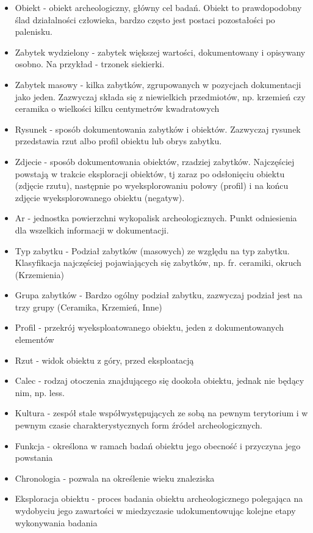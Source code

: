 \begin{itemize}
\item Obiekt - obiekt archeologiczny, główny cel badań. Obiekt to prawdopodobny ślad działalności człowieka, bardzo często jest postaci pozostałości po palenisku.
\item Zabytek wydzielony - zabytek większej wartości, dokumentowany i opisywany osobno. Na przykład - trzonek siekierki.
\item Zabytek masowy - kilka zabytków, zgrupowanych w pozycjach dokumentacji jako jeden. Zazwyczaj składa się z niewielkich przedmiotów, np. krzemień czy ceramika o wielkości kilku centymetrów kwadratowych
\item Rysunek - sposób dokumentowania zabytków i obiektów. Zazwyczaj rysunek przedstawia rzut albo profil obiektu lub obrys zabytku.
\item Zdjecie - sposób dokumentowania obiektów, rzadziej zabytków. Najczęściej powstają w trakcie eksploracji obiektów, tj zaraz po odsłonięciu obiektu (zdjęcie rzutu), następnie po wyeksplorowaniu połowy (profil) i na końcu zdjęcie wyeksplorowanego obiektu (negatyw).
\item Ar - jednostka powierzchni wykopalisk archeologicznych. Punkt odniesienia dla wszelkich informacji w dokumentacji.
\item Typ zabytku - Podział zabytków (masowych) ze względu na typ zabytku. Klasyfikacja najczęściej pojawiających się zabytków, np. fr. ceramiki, okruch (Krzemienia)
\item Grupa zabytków - Bardzo ogólny podział zabytku, zazwyczaj podział jest na trzy grupy (Ceramika, Krzemień, Inne)
\item Profil - przekrój wyeksploatowanego obiektu, jeden z dokumentowanych elementów
\item Rzut - widok obiektu z góry, przed eksploatacją
\item Calec - rodzaj otoczenia znajdującego się dookoła obiektu, jednak nie będący nim, np. less.
\item Kultura - zespół stale współwystępujących ze sobą na pewnym terytorium i w pewnym czasie charakterystycznych form źródeł archeologicznych.
\item Funkcja - określona w ramach badań obiektu jego obecność i przyczyna jego powstania
\item Chronologia - pozwala na określenie wieku znaleziska
\item Eksploracja obiektu - proces badania obiektu archeologicznego polegająca na wydobyciu jego zawartości w miedzyczasie udokumentowując kolejne etapy wykonywania badania
\end{itemize}
\newpage
